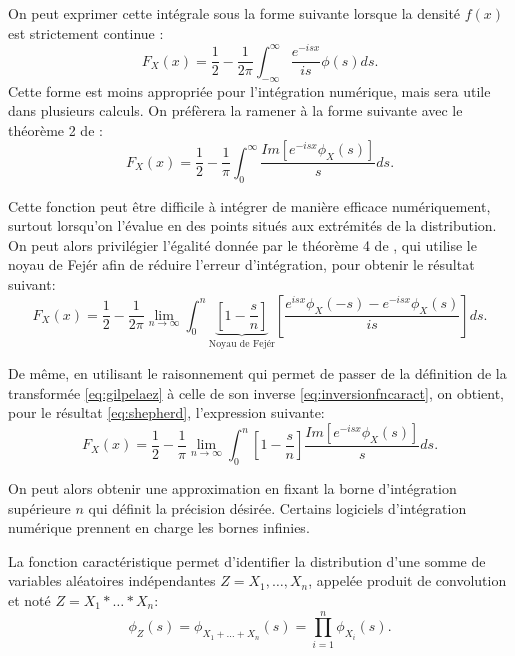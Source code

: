 On peut exprimer cette intégrale sous la forme suivante lorsque la
densité $f(x)$ est strictement continue \citep[p.66]{epps2007pricing}:
\begin{equation}
  \label{eq:gilpelaez2}
  F_X(x) = \frac{1}{2} - \frac{1}{2\pi} \int_{-\infty}^{\infty} \frac{e^{-isx}}{is} \phi(s) ds.
\end{equation}
Cette forme est moins appropriée pour l'intégration numérique, mais
sera utile dans plusieurs calculs.  On préfèrera la ramener à la forme
suivante avec le théorème 2 de \cite{wendel1961non}:
\begin{equation}
  \label{eq:inversionfncaract}
  F_X(x) = \frac{1}{2} - \frac{1}{\pi}\int_{0}^{\infty} \frac{Im\left[e^{-isx}\phi_X(s)\right]}{s} ds.
\end{equation}

Cette fonction peut être difficile à intégrer de manière efficace
numériquement, surtout lorsqu'on l'évalue en des points situés aux
extrémités de la distribution. On peut alors privilégier l'égalité
donnée par le théorème 4 de \cite{shephard1991characteristic}, qui
utilise le noyau de Fejér afin de réduire l'erreur d'intégration, pour
obtenir le résultat suivant:
\begin{equation}
  \label{eq:shepherd}
  F_X(x) = \frac{1}{2} - \frac{1}{2\pi} \lim_{n\rightarrow\infty} \int_{0}^{n} \underbrace{\left[ 1-\frac{s}{n} \right]}_{\text{Noyau de Fejér}} \left[ \frac{e^{isx}\phi_X(-s)-e^{-isx}\phi_X(s)}{is} \right] ds.
\end{equation}

De même, en utilisant le raisonnement qui permet de passer de la
définition de la transformée \eqref{eq:gilpelaez} à celle de son
inverse \eqref{eq:inversionfncaract}, on obtient, pour le résultat
\eqref{eq:shepherd}, l'expression suivante:
\begin{equation}
  \label{eq:approxinvfncaract}
  F_X(x) = \frac{1}{2} - \frac{1}{\pi} \lim_{n\rightarrow\infty} \int_{0}^{n} \left[ 1-\frac{s}{n} \right] \frac{Im\left[e^{-isx}\phi_X(s)\right]}{s}ds.
\end{equation}

On peut alors obtenir une approximation en fixant la borne
d'intégration supérieure $n$ qui définit la précision
désirée. Certains logiciels d'intégration numérique prennent en charge
les bornes infinies.

La fonction caractéristique permet d'identifier la distribution d'une
somme de variables aléatoires indépendantes $Z = X_1, \ldots, X_n$,
appelée produit de convolution et noté $Z = X_1 * \ldots * X_n$:
\begin{equation}
  \label{eq:convocaract}
  \phi_{Z}(s) = \phi_{X_1+\ldots+X_n}(s) = \prod_{i=1}^n \phi_{X_i}(s).
\end{equation}

